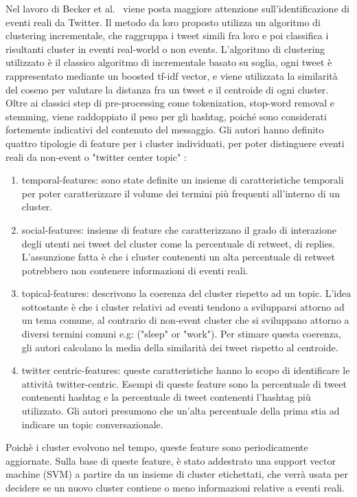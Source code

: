 Nel lavoro di Becker et al.~\cite{DBLP:conf/icwsm/BeckerNG11} viene posta maggiore attenzione sull'identificazione di eventi reali da Twitter. Il metodo da loro proposto utilizza un algoritmo di clustering incrementale, che raggruppa i tweet simili fra loro e poi classifica i risultanti cluster in eventi real-world o non events. L'algoritmo di clustering utilizzato è il classico algoritmo di incrementale basato su soglia, ogni tweet è rappresentato mediante un boosted tf-idf vector, e viene utilizzata la similarità del coseno per valutare la distanza fra un tweet e il centroide di ogni cluster. Oltre ai classici step di pre-processing come tokenization, stop-word removal e stemming, viene raddoppiato il peso per gli hashtag, poiché sono considerati fortemente indicativi del contenuto del messaggio. Gli autori hanno definito quattro tipologie di feature per i cluster individuati, per poter distinguere eventi reali  da non-event o "twitter center topic" :
\begin{enumerate}
\item temporal-features: sono state definite un insieme di caratteristiche temporali per poter caratterizzare il volume dei termini più frequenti all'interno di un cluster.
\item social-features: insieme di feature che caratterizzano il grado di interazione degli utenti nei tweet del cluster come la percentuale di retweet, di replies. L'assunzione fatta è che i cluster contenenti un alta percentuale di retweet potrebbero non contenere informazioni di eventi reali.
\item topical-features: descrivono la coerenza del cluster rispetto ad un topic. L'idea sottostante è che i cluster relativi ad eventi tendono a svilupparsi attorno ad un tema comune, al contrario di non-event cluster che si sviluppano attorno a diversi termini comuni e.g: ("sleep" or "work"). Per stimare questa coerenza, gli autori calcolano la media della similarità dei tweet rispetto al centroide.
\item twitter centric-features: queste caratteristiche hanno lo scopo di identificare le attività twitter-centric. Esempi di queste feature sono la percentuale di tweet contenenti hashtag e la percentuale di tweet contenenti l'hashtag più utilizzato. Gli autori presumono che un'alta percentuale della prima stia ad indicare un topic conversazionale.
\end{enumerate}
Poichè i cluster evolvono nel tempo, queste feature sono periodicamente aggiornate.
Sulla base di queste feature, è stato addestrato una support vector machine (SVM) a partire da un insieme di cluster etichettati, che verrà usata per decidere se un nuovo cluster contiene o meno informazioni relative a eventi reali. 

